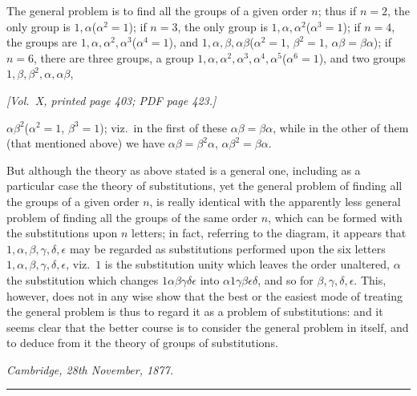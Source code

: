 \documentclass[11pt]{article}
\begin{document}
\medskip

The general problem is to find all the groups of a given order $n$; thus if $n = 2$, the only group is $1, \alpha$\;($\alpha^{2} = 1$); if $n = 3$, the only group is $1, \alpha, \alpha^{2}$\;($\alpha^{3} = 1$); if $n = 4$, the groups are $1, \alpha, \alpha^{2}, \alpha^{3}$\;($\alpha^{4}=1$), and $1, \alpha, \beta, \alpha\beta$\;($\alpha^{2}=1$, $\beta^{2}=1$, $\alpha\beta = \beta\alpha$); if $n = 6$, there are three groups, a group $1, \alpha, \alpha^{2}, \alpha^{3}, \alpha^{4}, \alpha^{5}$\;($\alpha^{6}=1$), and two groups $1, \beta, \beta^{2}, \alpha, \alpha\beta$,

\newpage

\noindent\textit{[Vol.~X, printed page 403; PDF page 423.]}

\medskip

$\alpha\beta^{2}$\;($\alpha^{2}=1$, $\beta^{3}=1$); viz.\ in the first of these $\alpha\beta = \beta\alpha$, while in the other of them (that mentioned above) we have $\alpha\beta = \beta^{2}\alpha$, $\alpha\beta^{2} = \beta\alpha$.

\medskip

But although the theory as above stated is a general one, including as a particular case the theory of substitutions, yet the general problem of finding all the groups of a given order $n$, is really identical with the apparently less general problem of finding all the groups of the same order $n$, which can be formed with the substitutions upon $n$ letters; in fact, referring to the diagram, it appears that $1, \alpha, \beta, \gamma, \delta, \epsilon$ may be regarded as substitutions performed upon the six letters $1, \alpha, \beta, \gamma, \delta, \epsilon$, viz.\ $1$ is the substitution unity which leaves the order unaltered, $\alpha$ the substitution which changes $1\alpha\beta\gamma\delta\epsilon$ into $\alpha 1\gamma\beta\epsilon\delta$, and so for $\beta, \gamma, \delta, \epsilon$. This, however, does not in any wise show that the best or the easiest mode of treating the general problem is thus to regard it as a problem of substitutions: and it seems clear that the better course is to consider the general problem in itself, and to deduce from it the theory of groups of substitutions.

\medskip

\hfill\textit{Cambridge, 28th November, 1877.}

\bigskip
\bigskip

\begin{center}
\rule{0.25\textwidth}{0.3pt}
\end{center}
\end{document}
